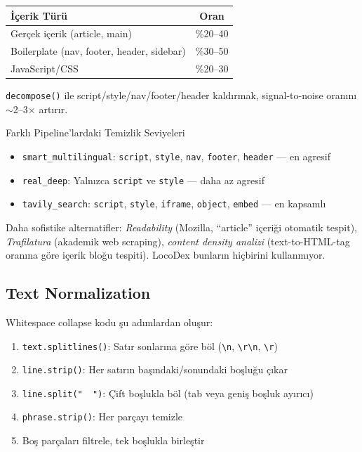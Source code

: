 \begin{center}
\begin{tabular}{lc}
\toprule
\color{chapterBlue}\textbf{\.{I}\c{c}erik T\"{u}r\"{u}} & \color{chapterBlue}\textbf{Oran} \\
\midrule
Ger\c{c}ek i\c{c}erik (article, main) & \%20--40 \\
Boilerplate (nav, footer, header, sidebar) & \%30--50 \\
JavaScript/CSS & \%20--30 \\
\bottomrule
\end{tabular}
\end{center}

\noindent
\texttt{decompose()} ile script/style/nav/footer/header kald{\i}rmak, signal-to-noise oran{\i}n{\i} $\sim$2--3$\times$ art{\i}r{\i}r.

\begin{kodref}{Farkl{\i} Pipeline'lardaki Temizlik Seviyeleri}
\begin{itemize}
  \item \texttt{smart\_multilingual}: \texttt{script}, \texttt{style}, \texttt{nav}, \texttt{footer}, \texttt{header} --- en agresif
  \item \texttt{real\_deep}: Yaln{\i}zca \texttt{script} ve \texttt{style} --- daha az agresif
  \item \texttt{tavily\_search}: \texttt{script}, \texttt{style}, \texttt{iframe}, \texttt{object}, \texttt{embed} --- en kapsaml{\i}
\end{itemize}
\end{kodref}

\noindent
Daha sofistike alternatifler: \textit{Readability} (Mozilla, ``article'' i\c{c}eri\u{g}i otomatik tespit), \textit{Trafilatura} (akademik web scraping), \textit{content density analizi} (text-to-HTML-tag oran{\i}na g\"{o}re i\c{c}erik blo\u{g}u tespiti). LocoDex bunlar{\i}n hi\c{c}birini kullanm{\i}yor.


\subsection{Text Normalization}
\label{subsec:text-normalization}

Whitespace collapse kodu \c{s}u ad{\i}mlardan olu\c{s}ur:

\begin{enumerate}
  \item \texttt{text.splitlines()}: Sat{\i}r sonlar{\i}na g\"{o}re b\"{o}l (\texttt{\textbackslash n}, \texttt{\textbackslash r\textbackslash n}, \texttt{\textbackslash r})
  \item \texttt{line.strip()}: Her sat{\i}r{\i}n ba\c{s}{\i}ndaki/sonundaki bo\c{s}lu\u{g}u \c{c}{\i}kar
  \item \texttt{line.split("~~")}: \c{C}ift bo\c{s}lukla b\"{o}l (tab veya geni\c{s} bo\c{s}luk ay{\i}r{\i}c{\i})
  \item \texttt{phrase.strip()}: Her par\c{c}ay{\i} temizle
  \item Bo\c{s} par\c{c}alar{\i} filtrele, tek bo\c{s}lukla birle\c{s}tir
\end{enumerate}

